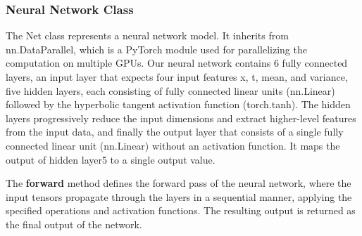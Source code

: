 \documentclass{article}
\begin{document}


\subsubsection{ Neural Network Class}

The Net class represents a neural network model. It inherits from nn.DataParallel, which is a PyTorch module used for parallelizing the computation on multiple GPUs.
Our neural network contains 6 fully connected layers, an input layer that expects four input features x, t, mean, and variance, five hidden layers, each consisting of fully connected linear units (nn.Linear) followed by the hyperbolic tangent activation function (torch.tanh). The hidden layers progressively reduce the input dimensions and extract higher-level features from the input data, 
and finally the output layer that consists of a single fully connected linear unit (nn.Linear) without an activation function. It maps the output of hidden layer5 to a single output value.

The \textbf{forward} method defines the forward pass of the neural network, where the input tensors propagate through the layers in a sequential manner, applying the specified operations and activation functions. The resulting output is returned as the final output of the network.

\end{document}
